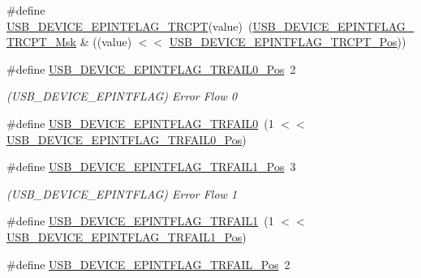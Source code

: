 \begin{DoxyCompactItemize}
\item 
\#define \mbox{\hyperlink{group___s_a_m_d21___u_s_b_gad85cbc7fdff29eb7d31662d45c07bb40}{U\+S\+B\+\_\+\+D\+E\+V\+I\+C\+E\+\_\+\+E\+P\+I\+N\+T\+F\+L\+A\+G\+\_\+\+T\+R\+C\+PT}}(value)~(\mbox{\hyperlink{group___s_a_m_d21___u_s_b_gaeca0559286c834d1b92627012fbfb157}{U\+S\+B\+\_\+\+D\+E\+V\+I\+C\+E\+\_\+\+E\+P\+I\+N\+T\+F\+L\+A\+G\+\_\+\+T\+R\+C\+P\+T\+\_\+\+Msk}} \& ((value) $<$$<$ \mbox{\hyperlink{group___s_a_m_d21___u_s_b_ga73d5e8d8d7a40178d9fe0f614dcee874}{U\+S\+B\+\_\+\+D\+E\+V\+I\+C\+E\+\_\+\+E\+P\+I\+N\+T\+F\+L\+A\+G\+\_\+\+T\+R\+C\+P\+T\+\_\+\+Pos}}))
\item 
\#define \mbox{\hyperlink{group___s_a_m_d21___u_s_b_gaabd62da03c34c9ed903fccf9eea5c067}{U\+S\+B\+\_\+\+D\+E\+V\+I\+C\+E\+\_\+\+E\+P\+I\+N\+T\+F\+L\+A\+G\+\_\+\+T\+R\+F\+A\+I\+L0\+\_\+\+Pos}}~2
\begin{DoxyCompactList}\small\item\em (U\+S\+B\+\_\+\+D\+E\+V\+I\+C\+E\+\_\+\+E\+P\+I\+N\+T\+F\+L\+AG) Error Flow 0 \end{DoxyCompactList}\item 
\#define \mbox{\hyperlink{group___s_a_m_d21___u_s_b_ga74d91dd6a8100e5c5df77735f9075947}{U\+S\+B\+\_\+\+D\+E\+V\+I\+C\+E\+\_\+\+E\+P\+I\+N\+T\+F\+L\+A\+G\+\_\+\+T\+R\+F\+A\+I\+L0}}~(1 $<$$<$ \mbox{\hyperlink{group___s_a_m_d21___u_s_b_gaabd62da03c34c9ed903fccf9eea5c067}{U\+S\+B\+\_\+\+D\+E\+V\+I\+C\+E\+\_\+\+E\+P\+I\+N\+T\+F\+L\+A\+G\+\_\+\+T\+R\+F\+A\+I\+L0\+\_\+\+Pos}})
\item 
\#define \mbox{\hyperlink{group___s_a_m_d21___u_s_b_ga14095c21551aee173b4cf51a4752289e}{U\+S\+B\+\_\+\+D\+E\+V\+I\+C\+E\+\_\+\+E\+P\+I\+N\+T\+F\+L\+A\+G\+\_\+\+T\+R\+F\+A\+I\+L1\+\_\+\+Pos}}~3
\begin{DoxyCompactList}\small\item\em (U\+S\+B\+\_\+\+D\+E\+V\+I\+C\+E\+\_\+\+E\+P\+I\+N\+T\+F\+L\+AG) Error Flow 1 \end{DoxyCompactList}\item 
\#define \mbox{\hyperlink{group___s_a_m_d21___u_s_b_ga15c2236625fcd3796b786434b14a434c}{U\+S\+B\+\_\+\+D\+E\+V\+I\+C\+E\+\_\+\+E\+P\+I\+N\+T\+F\+L\+A\+G\+\_\+\+T\+R\+F\+A\+I\+L1}}~(1 $<$$<$ \mbox{\hyperlink{group___s_a_m_d21___u_s_b_ga14095c21551aee173b4cf51a4752289e}{U\+S\+B\+\_\+\+D\+E\+V\+I\+C\+E\+\_\+\+E\+P\+I\+N\+T\+F\+L\+A\+G\+\_\+\+T\+R\+F\+A\+I\+L1\+\_\+\+Pos}})
\item 
\#define \mbox{\hyperlink{group___s_a_m_d21___u_s_b_ga0dcfe8589fa4aa6a596135a447291807}{U\+S\+B\+\_\+\+D\+E\+V\+I\+C\+E\+\_\+\+E\+P\+I\+N\+T\+F\+L\+A\+G\+\_\+\+T\+R\+F\+A\+I\+L\+\_\+\+Pos}}~2
$$
\end{DoxyCompactItemize}
